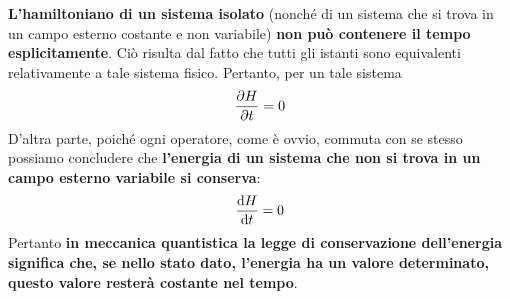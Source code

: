 \documentclass[a4paper,12pt,oneside]{book}
\begin{document}
\textbf{L'hamiltoniano di un sistema isolato} (nonché di un sistema che si trova in un campo esterno costante e non variabile) \textbf{non può contenere il tempo esplicitamente}. Ciò risulta dal fatto che tutti gli istanti sono equivalenti relativamente a tale sistema fisico. Pertanto, per un tale sistema
\begin{equation}
  \pdv{H}{t} = 0
\end{equation}
D'altra parte, poiché ogni operatore, come è ovvio, commuta con se stesso possiamo concludere che \textbf{l'energia di un sistema che non si trova in un campo esterno variabile si conserva}:
\begin{equation}
  \dv{H}{t} = 0
\end{equation}
Pertanto \textbf{in meccanica quantistica la legge di conservazione dell'energia significa che, se nello stato dato, l'energia ha un valore determinato, questo valore resterà costante nel tempo}.
\end{document}
